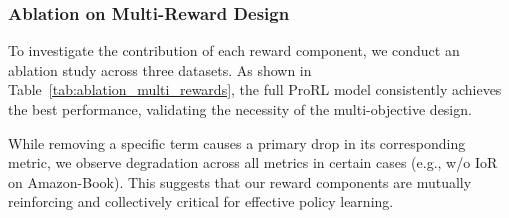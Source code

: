 \documentclass{llmxive}
\begin{document}
\subsubsection{Ablation on Multi-Reward Design}
\label{sec:ablation_multi_rewards}
To investigate the contribution of each reward component, we conduct an ablation study across three datasets. As shown in Table~\ref{tab:ablation_multi_rewards}, the full ProRL model consistently achieves the best performance, validating the necessity of the multi-objective design.

While removing a specific term causes a primary drop in its corresponding metric, we observe degradation across all metrics in certain cases (e.g., w/o IoR on Amazon-Book). This suggests that our reward components are mutually reinforcing and collectively critical for effective policy learning.

\begin{table}[t!]
  \centering
\caption{Ablation study on the multi-reward design}
\label{tab:ablation_multi_rewards}
\end{table}
\end{document}
